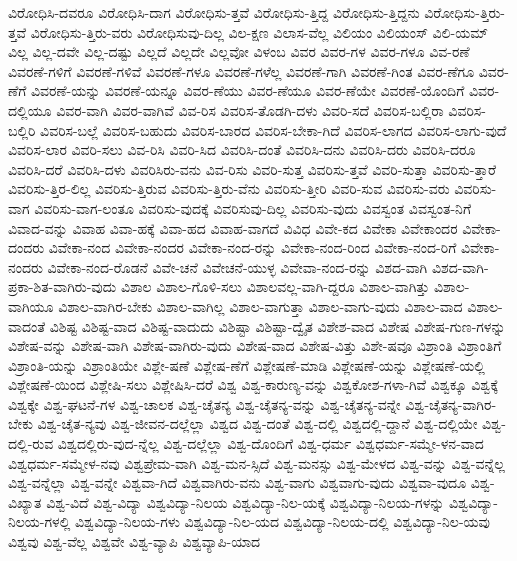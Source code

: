 {ವಿರೋಧಿಸಿ-ದವರೂ
ವಿರೋಧಿಸಿ-ದಾಗ
ವಿರೋಧಿಸು-ತ್ತವೆ
ವಿರೋಧಿಸು-ತ್ತಿದ್ದ
ವಿರೋಧಿಸು-ತ್ತಿದ್ದನು
ವಿರೋಧಿಸು-ತ್ತಿರು-ತ್ತವೆ
ವಿರೋಧಿಸು-ತ್ತಿರು-ವರು
ವಿರೋಧಿಸುವು-ದಿಲ್ಲ
ವಿಲ-ಕ್ಷಣ
ವಿಲಾಸ-ವೆಲ್ಲ
ವಿಲಿಯಂ
ವಿಲಿಯಂಸ್
ವಿಲಿ-ಯಮ್
ವಿಲ್ಲ
ವಿಲ್ಲ-ದವೇ
ವಿಲ್ಲ-ದಷ್ಟು
ವಿಲ್ಲದೆ
ವಿಲ್ಲದೇ
ವಿಲ್ಲವೋ
ವಿಳಂಬ
ವಿವರ
ವಿವರ-ಗಳ
ವಿವರ-ಗಳೂ
ವಿವ-ರಣೆ
ವಿವರಣೆ-ಗಳಿಗೆ
ವಿವರಣೆ-ಗಳಿವೆ
ವಿವರಣೆ-ಗಳೂ
ವಿವರಣೆ-ಗಳೆಲ್ಲ
ವಿವರಣೆ-ಗಾಗಿ
ವಿವರಣೆ-ಗಿಂತ
ವಿವರ-ಣೆಗೂ
ವಿವರ-ಣೆಗೆ
ವಿವರಣೆ-ಯನ್ನು
ವಿವರಣೆ-ಯನ್ನೂ
ವಿವರ-ಣೆಯು
ವಿವರ-ಣೆಯೂ
ವಿವರ-ಣೆಯೇ
ವಿವರಣೆ-ಯೊಂದಿಗೆ
ವಿವರ-ದಲ್ಲಿಯೂ
ವಿವರ-ವಾಗಿ
ವಿವರ-ವಾಗಿವೆ
ವಿವ-ರಿಸ
ವಿವರಿಸ-ತೊಡಗಿ-ದಳು
ವಿವರಿ-ಸದೆ
ವಿವರಿಸ-ಬಲ್ಲಿರಾ
ವಿವರಿಸ-ಬಲ್ಲಿರಿ
ವಿವರಿಸ-ಬಲ್ಲೆ
ವಿವರಿಸ-ಬಹುದು
ವಿವರಿಸ-ಬಾರದ
ವಿವರಿಸ-ಬೇಕಾ-ಗಿದೆ
ವಿವರಿಸ-ಲಾಗದ
ವಿವರಿಸ-ಲಾಗು-ವುದೆ
ವಿವರಿಸ-ಲಾರ
ವಿವರಿ-ಸಲು
ವಿವ-ರಿಸಿ
ವಿವರಿ-ಸಿದ
ವಿವರಿಸಿ-ದಂತೆ
ವಿವರಿಸಿ-ದನು
ವಿವರಿಸಿ-ದರು
ವಿವರಿಸಿ-ದರೂ
ವಿವರಿಸಿ-ದರೆ
ವಿವರಿಸಿ-ದಳು
ವಿವರಿಸಿರು-ವನು
ವಿವ-ರಿಸು
ವಿವರಿ-ಸುತ್ತ
ವಿವರಿಸು-ತ್ತವೆ
ವಿವರಿ-ಸುತ್ತಾ
ವಿವರಿಸು-ತ್ತಾರೆ
ವಿವರಿಸು-ತ್ತಿರ-ಲಿಲ್ಲ
ವಿವರಿಸು-ತ್ತಿರುವ
ವಿವರಿಸು-ತ್ತಿರು-ವೆನು
ವಿವರಿಸು-ತ್ತೀರಿ
ವಿವರಿ-ಸುವ
ವಿವರಿಸು-ವರು
ವಿವರಿಸು-ವಾಗ
ವಿವರಿಸು-ವಾಗ-ಲಂತೂ
ವಿವರಿಸು-ವುದಕ್ಕೆ
ವಿವರಿಸುವು-ದಿಲ್ಲ
ವಿವರಿಸು-ವುದು
ವಿವಸ್ವಂತ
ವಿವಸ್ವಂತ-ನಿಗೆ
ವಿವಾದ-ವನ್ನು
ವಿವಾಹ
ವಿವಾ-ಹಕ್ಕೆ
ವಿವಾ-ಹದ
ವಿವಾಹ-ವಾಗದೆ
ವಿವಿಧ
ವಿವೇ-ಕದ
ವಿವೇಕಾ
ವಿವೇಕಾಂದರ
ವಿವೇಕಾ-ದಂದರು
ವಿವೇಕಾ-ನಂದ
ವಿವೇಕಾ-ನಂದರ
ವಿವೇಕಾ-ನಂದ-ರನ್ನು
ವಿವೇಕಾ-ನಂದ-ರಿಂದ
ವಿವೇಕಾ-ನಂದ-ರಿಗೆ
ವಿವೇಕಾ-ನಂದರು
ವಿವೇಕಾ-ನಂದ-ರೊಡನೆ
ವಿವೇ-ಚನೆ
ವಿವೇಚನೆ-ಯುಳ್ಳ
ವಿವೇವಾ-ನಂದ-ರನ್ನು
ವಿಶದ-ವಾಗಿ
ವಿಶದ-ವಾಗಿ-ಪ್ರಕಾ-ಶಿತ-ವಾಗಿರು-ವುದು
ವಿಶಾಲ
ವಿಶಾಲ-ಗೊಳಿ-ಸಲು
ವಿಶಾಲವಲ್ಲ-ವಾಗಿ-ದ್ದರೂ
ವಿಶಾಲ-ವಾಗಿತ್ತು
ವಿಶಾಲ-ವಾಗಿಯೂ
ವಿಶಾಲ-ವಾಗಿರ-ಬೇಕು
ವಿಶಾಲ-ವಾಗಿಲ್ಲ
ವಿಶಾಲ-ವಾಗುತ್ತಾ
ವಿಶಾಲ-ವಾಗು-ವುದು
ವಿಶಾಲ-ವಾದ
ವಿಶಾಲ-ವಾದಂತೆ
ವಿಶಿಷ್ಟ
ವಿಶಿಷ್ಟ-ವಾದ
ವಿಶಿಷ್ಟ-ವಾದುದು
ವಿಶಿಷ್ಟಾ
ವಿಶಿಷ್ಟಾ-ದ್ವೈತ
ವಿಶೇಶ-ವಾದ
ವಿಶೇಷ
ವಿಶೇಷ-ಗುಣ-ಗಳನ್ನು
ವಿಶೇಷ-ವನ್ನು
ವಿಶೇಷ-ವಾಗಿ
ವಿಶೇಷ-ವಾಗಿರು-ವುದು
ವಿಶೇಷ-ವಾದ
ವಿಶೇಷ-ವಿತ್ತು
ವಿಶೇ-ಷವೂ
ವಿಶ್ರಾಂತಿ
ವಿಶ್ರಾಂತಿಗೆ
ವಿಶ್ರಾಂತಿ-ಯನ್ನು
ವಿಶ್ರಾಂತಿಯೇ
ವಿಶ್ಲೇ-ಷಣೆ
ವಿಶ್ಲೇಷ-ಣೆಗೆ
ವಿಶ್ಲೇಷಣೆ-ಮಾಡಿ
ವಿಶ್ಲೇಷಣೆ-ಯನ್ನು
ವಿಶ್ಲೇಷಣೆ-ಯಲ್ಲಿ
ವಿಶ್ಲೇಷಣೆ-ಯಿಂದ
ವಿಶ್ಲೇಷಿ-ಸಲು
ವಿಶ್ಲೇಷಿಸಿ-ದರೆ
ವಿಶ್ವ
ವಿಶ್ವ-ಕಾರುಣ್ಯ-ವನ್ನು
ವಿಶ್ವಕೋಶ-ಗಳಾ-ಗಿವೆ
ವಿಶ್ವಕ್ಕೂ
ವಿಶ್ವಕ್ಕೆ
ವಿಶ್ವಕ್ಕೇ
ವಿಶ್ವ-ಘಟನೆ-ಗಳ
ವಿಶ್ವ-ಚಾಲಕ
ವಿಶ್ವ-ಚೈತನ್ಯ
ವಿಶ್ವ-ಚೈತನ್ಯ-ವನ್ನು
ವಿಶ್ವ-ಚೈತನ್ಯ-ವನ್ನೇ
ವಿಶ್ವ-ಚೈತನ್ಯ-ವಾಗಿರ-ಬೇಕು
ವಿಶ್ವ-ಚೈತ-ನ್ಯವು
ವಿಶ್ವ-ಜೀವನ-ದಲ್ಲೆಲ್ಲಾ
ವಿಶ್ವದ
ವಿಶ್ವ-ದಂತೆ
ವಿಶ್ವ-ದಲ್ಲಿ
ವಿಶ್ವದಲ್ಲಿ-ದ್ದಾನೆ
ವಿಶ್ವ-ದಲ್ಲಿಯೇ
ವಿಶ್ವ-ದಲ್ಲಿ-ರುವ
ವಿಶ್ವದಲ್ಲಿರು-ವುದ-ನ್ನೆಲ್ಲ
ವಿಶ್ವ-ದಲ್ಲೆಲ್ಲಾ
ವಿಶ್ವ-ದೊಂದಿಗೆ
ವಿಶ್ವ-ಧರ್ಮ
ವಿಶ್ವಧರ್ಮ-ಸಮ್ಮೇ-ಳನ-ವಾದ
ವಿಶ್ವಧರ್ಮ-ಸಮ್ಮೇಳ-ನವು
ವಿಶ್ವಪ್ರೇಮ-ವಾಗಿ
ವಿಶ್ವ-ಮನ-ಸ್ಸಿದೆ
ವಿಶ್ವ-ಮನಸ್ಸು
ವಿಶ್ವ-ಮೇಳದ
ವಿಶ್ವ-ವನ್ನು
ವಿಶ್ವ-ವನ್ನೆಲ್ಲ
ವಿಶ್ವ-ವನ್ನೆಲ್ಲಾ
ವಿಶ್ವ-ವನ್ನೇ
ವಿಶ್ವವಾ-ಗಿದೆ
ವಿಶ್ವವಾಗಿರು-ವನು
ವಿಶ್ವ-ವಾಗು
ವಿಶ್ವವಾಗು-ವುದು
ವಿಶ್ವವಾ-ವುದೂ
ವಿಶ್ವ-ವಿಖ್ಯಾತ
ವಿಶ್ವ-ವಿದೆ
ವಿಶ್ವ-ವಿದ್ಯಾ
ವಿಶ್ವವಿದ್ಯಾ-ನಿಲಯ
ವಿಶ್ವವಿದ್ಯಾ-ನಿಲ-ಯಕ್ಕೆ
ವಿಶ್ವವಿದ್ಯಾ-ನಿಲಯ-ಗಳನ್ನು
ವಿಶ್ವವಿದ್ಯಾ-ನಿಲಯ-ಗಳಲ್ಲಿ
ವಿಶ್ವವಿದ್ಯಾ-ನಿಲಯ-ಗಳು
ವಿಶ್ವವಿದ್ಯಾ-ನಿಲ-ಯದ
ವಿಶ್ವವಿದ್ಯಾ-ನಿಲಯ-ದಲ್ಲಿ
ವಿಶ್ವವಿದ್ಯಾ-ನಿಲ-ಯವು
ವಿಶ್ವವು
ವಿಶ್ವ-ವೆಲ್ಲ
ವಿಶ್ವವೇ
ವಿಶ್ವ-ವ್ಯಾಪಿ
ವಿಶ್ವವ್ಯಾಪಿ-ಯಾದ
}
